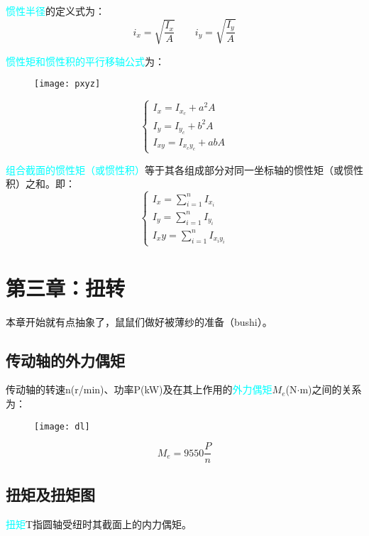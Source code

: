 \documentclass[10pt,a4paper]{ctexart}
\begin{document}
\textcolor{cyan}{惯性半径}的定义式为：
\begin{equation}
i_x=\sqrt{\frac{I_x}{A}} \qquad i_y=\sqrt{\frac{I_y}{A}}
\end{equation}

\textcolor{cyan}{惯性矩和惯性积的平行移轴公式}为：
\begin{figure}[htp]%
	\centering
	\texttt{[image: pxyz]}
\end{figure}

\begin{equation}
	\begin{cases}
		I_x=I_{x_c}+a^2A\\
		I_y=I_{y_c}+b^2A\\
		I_{xy}=I_{x_cy_c}+abA
	\end{cases}
\end{equation}

\textcolor{cyan}{组合截面的惯性矩（或惯性积）}等于其各组成部分对同一坐标轴的惯性矩（或惯性积）之和。即：
\begin{equation}
	\begin{cases}
		I_x=\sum\limits_{i=1}^n I_{x_i}\\
		I_y=\sum\limits_{i=1}^n I_{y_i}\\
		I_xy=\sum\limits_{i=1}^n I_{x_iy_i}
	\end{cases}
\end{equation}
\newpage
\section{第三章：扭转}
本章开始就有点抽象了，鼠鼠们做好被薄纱的准备（bushi）。

\subsection{传动轴的外力偶矩}
传动轴的转速n(r/min)、功率P(kW)及在其上作用的\textcolor{cyan}{外力偶矩}$M_e$(N$\cdot$m)之间的关系为：

\begin{figure}[htp]%
	\centering
	\texttt{[image: dl]}
\end{figure}

\begin{equation}
	M_e=9550\frac{P}{n}
\end{equation}

\subsection{扭矩及扭矩图}
\textcolor{cyan}{扭矩}T指圆轴受纽时其截面上的内力偶矩。
\end{document}
